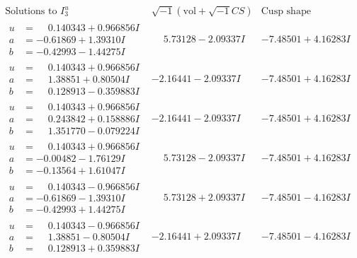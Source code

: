 \documentclass[1p]{elsarticle_modified}
\theoremstyle{definition}
\newcommand{\I}{\sqrt{-1}}
\begin{document}
$$\begin{array}{c|c|c}  
\text{Solutions to }I^u_{3}& \I (\text{vol} + \sqrt{-1}CS) & \text{Cusp shape}\\
 \hline 
\begin{aligned}
u &= \phantom{-}0.140343 + 0.966856 I \\
a &= -0.61869 + 1.39310 I \\
b &= -0.42993 - 1.44275 I\end{aligned}
 & \phantom{-}5.73128 - 2.09337 I & -7.48501 + 4.16283 I \\ \hline\begin{aligned}
u &= \phantom{-}0.140343 + 0.966856 I \\
a &= \phantom{-}1.38851 + 0.80504 I \\
b &= \phantom{-}0.128913 - 0.359883 I\end{aligned}
 & -2.16441 - 2.09337 I & -7.48501 + 4.16283 I \\ \hline\begin{aligned}
u &= \phantom{-}0.140343 + 0.966856 I \\
a &= \phantom{-}0.243842 + 0.158886 I \\
b &= \phantom{-}1.351770 - 0.079224 I\end{aligned}
 & -2.16441 - 2.09337 I & -7.48501 + 4.16283 I \\ \hline\begin{aligned}
u &= \phantom{-}0.140343 + 0.966856 I \\
a &= -0.00482 - 1.76129 I \\
b &= -0.13564 + 1.61047 I\end{aligned}
 & \phantom{-}5.73128 - 2.09337 I & -7.48501 + 4.16283 I \\ \hline\begin{aligned}
u &= \phantom{-}0.140343 - 0.966856 I \\
a &= -0.61869 - 1.39310 I \\
b &= -0.42993 + 1.44275 I\end{aligned}
 & \phantom{-}5.73128 + 2.09337 I & -7.48501 - 4.16283 I \\ \hline\begin{aligned}
u &= \phantom{-}0.140343 - 0.966856 I \\
a &= \phantom{-}1.38851 - 0.80504 I \\
b &= \phantom{-}0.128913 + 0.359883 I\end{aligned}
 & -2.16441 + 2.09337 I & -7.48501 - 4.16283 I \\ \hline\begin{aligned}

\end{aligned}
\end{array}$$
\end{document}

